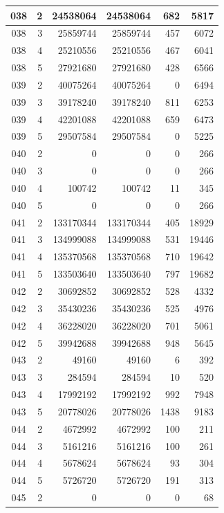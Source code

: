 \begin{longtable}{|c|r|r|r|r|r|}
\hline
038 & 2 & 24538064 & 24538064 & 682 & 5817 \\
\hline
038 & 3 & 25859744 & 25859744 & 457 & 6072 \\
\hline
038 & 4 & 25210556 & 25210556 & 467 & 6041 \\
\hline
038 & 5 & 27921680 & 27921680 & 428 & 6566 \\
\hline
039 & 2 & 40075264 & 40075264 & 0 & 6494 \\
\hline
039 & 3 & 39178240 & 39178240 & 811 & 6253 \\
\hline
039 & 4 & 42201088 & 42201088 & 659 & 6473 \\
\hline
039 & 5 & 29507584 & 29507584 & 0 & 5225 \\
\hline
040 & 2 & 0 & 0 & 0 & 266 \\
\hline
040 & 3 & 0 & 0 & 0 & 266 \\
\hline
040 & 4 & 100742 & 100742 & 11 & 345 \\
\hline
040 & 5 & 0 & 0 & 0 & 266 \\
\hline
041 & 2 & 133170344 & 133170344 & 405 & 18929 \\
\hline
041 & 3 & 134999088 & 134999088 & 531 & 19446 \\
\hline
041 & 4 & 135370568 & 135370568 & 710 & 19642 \\
\hline
041 & 5 & 133503640 & 133503640 & 797 & 19682 \\
\hline
042 & 2 & 30692852 & 30692852 & 528 & 4332 \\
\hline
042 & 3 & 35430236 & 35430236 & 525 & 4976 \\
\hline
042 & 4 & 36228020 & 36228020 & 701 & 5061 \\
\hline
042 & 5 & 39942688 & 39942688 & 948 & 5645 \\
\hline
043 & 2 & 49160 & 49160 & 6 & 392 \\
\hline
043 & 3 & 284594 & 284594 & 10 & 520 \\
\hline
043 & 4 & 17992192 & 17992192 & 992 & 7948 \\
\hline
043 & 5 & 20778026 & 20778026 & 1438 & 9183 \\
\hline
044 & 2 & 4672992 & 4672992 & 100 & 211 \\
\hline
044 & 3 & 5161216 & 5161216 & 100 & 261 \\
\hline
044 & 4 & 5678624 & 5678624 & 93 & 304 \\
\hline
044 & 5 & 5726720 & 5726720 & 191 & 313 \\
\hline
045 & 2 & 0 & 0 & 0 & 68 \\

\end{longtable}
